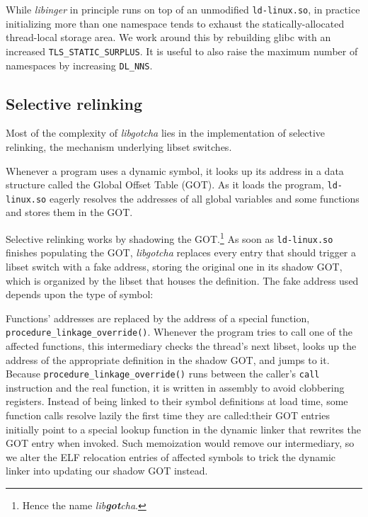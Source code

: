 
While \textit{libinger} in principle runs on top of an unmodified
\texttt{ld-linux.so}, in
practice initializing more than one namespace tends to exhaust the
statically-allocated thread-local storage area.  We work around this by rebuilding
glibc with an increased \texttt{TLS\_STATIC\_SURPLUS}.  It is useful to also raise
the maximum number of namespaces by increasing \texttt{DL\_NNS}.




\subsection{Selective relinking}
\label{sec:relinking}

Most of the complexity of \textit{libgotcha} lies in the implementation of selective
relinking, the mechanism underlying libset switches.

Whenever a program uses a dynamic symbol, it looks up its address in a data structure
called the Global Offset Table (GOT).  As it loads the program, \texttt{ld-linux.so}
eagerly resolves the addresses of all global variables and some functions and stores
them in the GOT.

Selective relinking works by shadowing the GOT.\footnote{Hence the name
\textit{lib\textbf{got}cha}.}  As soon as \texttt{ld-linux.so} finishes populating
the GOT, \textit{libgotcha} replaces every entry that should trigger a libset switch
with a fake address, storing the original one in its shadow GOT, which is organized
by the libset that houses the definition.  The fake address used depends upon the
type of symbol:



Functions' addresses are replaced by the address of a special function,
\texttt{procedure\_linkage\_override()}.  Whenever the program tries to call one of
the affected functions, this intermediary checks the thread's next libset, looks up
the address of the appropriate definition in the shadow GOT, and jumps to it.
Because \texttt{procedure\_linkage\_override()} runs between the caller's
\texttt{call} instruction and the real function, it is written in assembly to avoid
clobbering registers.  Instead of being linked to their symbol definitions at load
time, some function calls resolve lazily the first time they are called:\@ their GOT
entries initially point to a special lookup function in the dynamic linker that
rewrites the GOT entry when invoked.  Such memoization would remove our intermediary,
so we alter the ELF relocation entries of affected symbols to trick the dynamic
linker into updating our shadow GOT instead.

